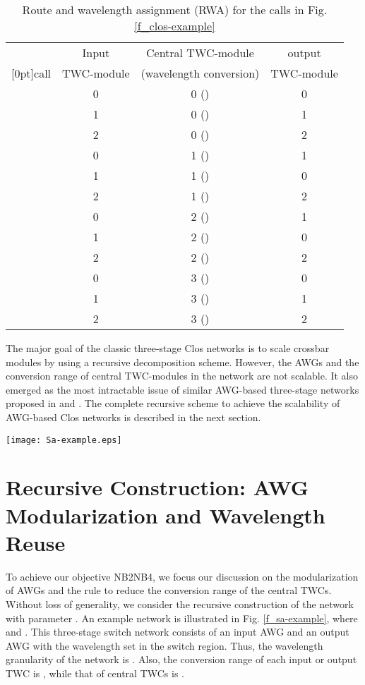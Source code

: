 \documentclass[journal]{IEEEtran}
\newcommand{\rb}[1]{\raisebox{1.2ex}[0pt]{#1}}
\begin{document}
\begin{table}[t]
\centering \caption{Route and wavelength assignment (RWA) for the
calls in Fig. \ref{f_clos-example}}
\begin{tabular}{||c|c|c|c||}
\hline  & Input & Central TWC-module & output \\
\rb{call} &  TWC-module & (wavelength conversion) & TWC-module \\
\hline\hline  &  0 & 0 () & 0 \\
\hline  & 1 & 0 () & 1 \\
\hline  & 2 & 0 () & 2 \\
\hline\hline  & 0 & 1 () & 1 \\
\hline  & 1 & 1 () & 0 \\
\hline  & 2 & 1 () & 2 \\
\hline\hline  & 0 & 2 () & 1 \\
\hline  & 1 & 2 () & 0 \\
\hline  & 2 & 2 () & 2 \\
\hline\hline  & 0 & 3 () & 0 \\
\hline  & 1 & 3 () & 1 \\
\hline  & 2 & 3 () & 2 \\
\hline
\end{tabular}\label{t_RWA}
\end{table}

The major goal of the classic three-stage Clos networks is to scale
crossbar modules by using a recursive decomposition scheme. However,
the AWGs and the conversion range of central TWC-modules in the
network   are not scalable. It also emerged
as the most intractable issue of similar AWG-based three-stage
networks proposed in \cite{Zhong:JLT1996} and
\cite{Leonardus:EU2007}. The complete recursive scheme to achieve
the scalability of AWG-based Clos networks is described in the next
section.

\begin{figure*}[t]
\centering
\texttt{[image: Sa-example.eps]}
\caption{An AWG-based three-stage network
.}\label{f_sa-example}
\end{figure*}

\section{Recursive Construction: AWG Modularization and Wavelength Reuse}\label{recurConstruction}
To achieve our objective NB2NB4, we focus our discussion on
the modularization of AWGs and the rule to reduce the conversion
range of the central TWCs. Without loss of generality, we consider
the recursive construction of the network 
with parameter . An example network is illustrated in
Fig. \ref{f_sa-example}, where  and . This 
three-stage switch network consists of an  input
AWG and an  output AWG with the wavelength set
 in the
switch region. Thus, the wavelength granularity of the network
 is . Also, the conversion
range of each input or output TWC is , while that of central TWCs
is .
\end{document}
